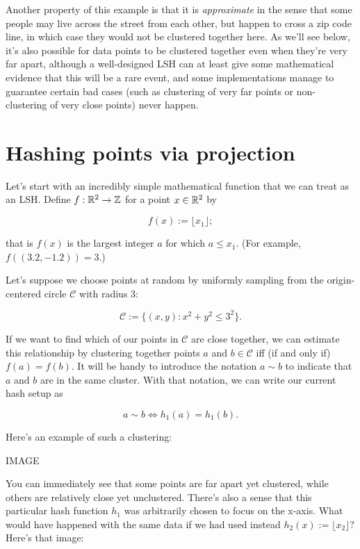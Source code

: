 \documentclass[20pt,]{extarticle}
\begin{document}
Another property of this example is that it is \emph{approximate} in the
sense that some people may live across the street from each other, but
happen to cross a zip code line, in which case they would not be
clustered together here. As we'll see below, it's also possible for data
points to be clustered together even when they're very far apart,
although a well-designed LSH can at least give some mathematical
evidence that this will be a rare event, and some implementations manage
to guarantee certain bad cases (such as clustering of very far points or
non-clustering of very close points) never happen.

\section{Hashing points via
projection}\label{hashing-points-via-projection}

Let's start with an incredibly simple mathematical function that we can
treat as an LSH. Define \(f:\mathbb{R}^2 \to \mathbb{Z}\) for a point \(x\in\mathbb{R}^2\) by

\[ f(x) := \lfloor x_1 \rfloor; \]

that is \(f(x)\) is the largest integer \(a\) for which \(a\le x_1.\)
(For example, \(f((3.2, -1.2)) = 3.\))

Let's suppose we choose points at random by uniformly sampling from the
origin-centered circle \(\mathcal C\) with radius 3:

\[ \mathcal C := \{ (x, y) : x^2 + y^2 \le 3^2 \}. \]

If we want to find which of our points in \(\mathcal C\) are close
together, we can estimate this relationship by clustering together
points \(a\) and \(b \in \mathcal C\) iff (if and only if)
\(f(a) = f(b).\) It will be handy to introduce the notation \(a \sim b\)
to indicate that \(a\) and \(b\) are in the same cluster. With that
notation, we can write our current hash setup as

\[ a \sim b \iff h_1(a) = h_1(b). \]

Here's an example of such a clustering:

IMAGE

You can immediately see that some points are far apart yet clustered,
while others are relatively close yet unclustered. There's also a sense
that this particular hash function \(h_1\) was arbitrarily chosen to
focus on the x-axis. What would have happened with the same data if we
had used instead \(h_2(x) := \lfloor x_2 \rfloor?\) Here's that image:
\end{document}
